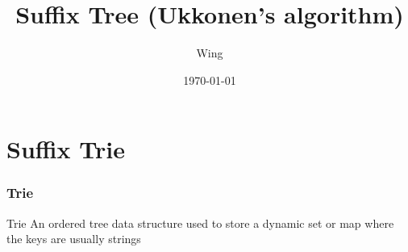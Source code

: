 \documentclass[compress,usenames,dvipsnames]{beamer}
\author{Wing}
\title{Suffix Tree (Ukkonen's algorithm)}
\begin{document}
\date{\today} 

\frame[plain]{\titlepage} %


\section{Suffix Trie}
\begin{frame} \frametitle{Trie}
    \begin{block}{Trie}
        An ordered tree data structure used to store a dynamic set or map where the keys are usually strings
    \end{block}
\end{frame}
\end{document}
